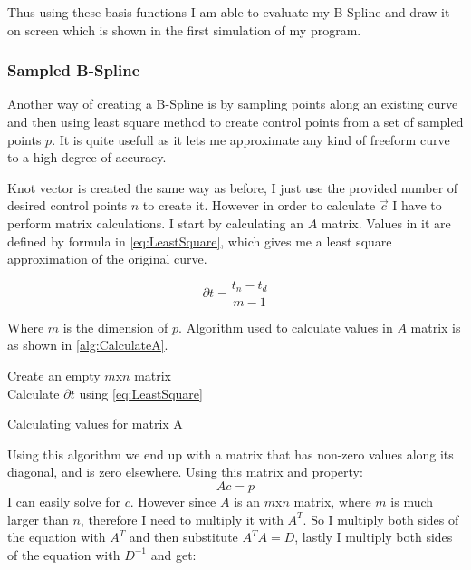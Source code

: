 \documentclass[a4paper,12pt]{extarticle}
\begin{document}
Thus using these basis functions I am able to evaluate my B-Spline and draw it on screen which is shown in the first simulation of my program.

\subsubsection{Sampled B-Spline}
Another way of creating a B-Spline is by sampling points along an existing curve and then using least square method to create control points from a set of sampled points $p$. It is quite usefull as it lets me approximate any kind of freeform curve to a high degree of accuracy.

Knot vector is created the same way as before, I just use the provided number of desired control points $n$ to create it. However in order to calculate $\vec{c}$ I have to perform matrix calculations. I start by calculating an $A$ matrix. Values in it are defined by formula in \cref{eq:LeastSquare}, which gives me a least square approximation of the original curve.

\begin{equation}
\partial t = \frac{t_n - t_d}{m-1}
\label{eq:LeastSquare}
\end{equation}

Where $m$ is the dimension of $p$. Algorithm used to calculate values in $A$ matrix is as shown in \cref{alg:CalculateA}.

\begin{algorithm}
  Create an empty $m$x$n$ matrix\\
  Calculate $\partial t$ using \eqref{eq:LeastSquare}\\
  \caption{Calculating values for matrix A}
  \label{alg:CalculateA}
\end{algorithm}

Using this algorithm we end up with a matrix that has non-zero values along its diagonal, and is zero elsewhere. Using this matrix and property: $$Ac = p$$ I can easily solve for $c$. However since $A$ is an $m$x$n$ matrix, where $m$ is much larger than $n$, therefore I need to multiply it with $A^T$. So I multiply both sides of the equation with $A^T$ and then substitute $A^TA=D$, lastly I multiply both sides of the equation with $D^{-1}$ and get:
\end{document}
